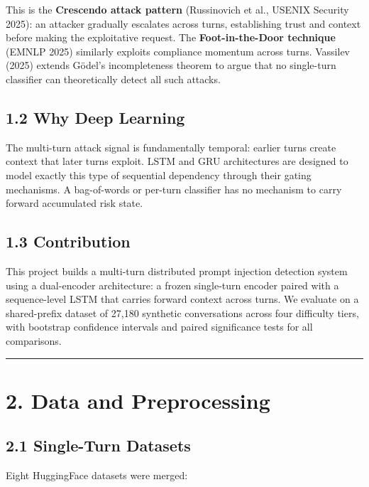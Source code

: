 \documentclass[
  11pt,
]{report}
\begin{document}
This is the \textbf{Crescendo attack pattern} (Russinovich et al.,
USENIX Security 2025): an attacker gradually escalates across turns,
establishing trust and context before making the exploitative request.
The \textbf{Foot-in-the-Door technique} (EMNLP 2025) similarly exploits
compliance momentum across turns. Vassilev (2025) extends Gödel's
incompleteness theorem to argue that no single-turn classifier can
theoretically detect all such attacks.

\subsection{1.2 Why Deep Learning}\label{why-deep-learning}

The multi-turn attack signal is fundamentally temporal: earlier turns
create context that later turns exploit. LSTM and GRU architectures are
designed to model exactly this type of sequential dependency through
their gating mechanisms. A bag-of-words or per-turn classifier has no
mechanism to carry forward accumulated risk state.

\subsection{1.3 Contribution}\label{contribution}

This project builds a multi-turn distributed prompt injection detection
system using a dual-encoder architecture: a frozen single-turn encoder
paired with a sequence-level LSTM that carries forward context across
turns. We evaluate on a shared-prefix dataset of 27,180 synthetic
conversations across four difficulty tiers, with bootstrap confidence
intervals and paired significance tests for all comparisons.

\begin{center}\rule{0.5\linewidth}{0.5pt}\end{center}

\section{2. Data and Preprocessing}\label{data-and-preprocessing}

\subsection{2.1 Single-Turn Datasets}\label{single-turn-datasets}

Eight HuggingFace datasets were merged:
\end{document}
